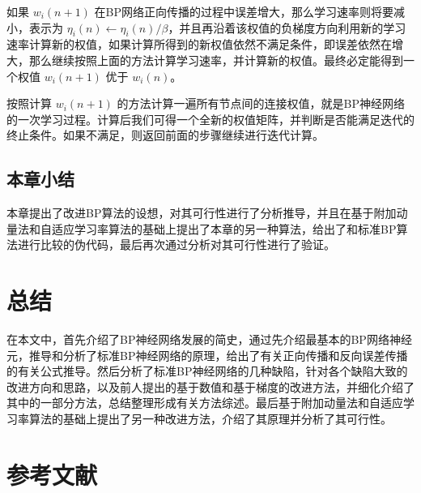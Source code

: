 \documentclass[UTF8]{ctexart}
\begin{document}
如果 $w_i(n+1)$ 在BP网络正向传播的过程中误差增大，那么学习速率则将要减小，表示为 $\eta_i(n) \gets \eta_i(n) / \beta$，并且再沿着该权值的负梯度方向利用新的学习速率计算新的权值，如果计算所得到的新权值依然不满足条件，即误差依然在增大，那么继续按照上面的方法计算学习速率，并计算新的权值。最终必定能得到一个权值 $w_i(n+1)$ 优于 $w_i(n)$。 \par

按照计算 $w_i(n+1)$ 的方法计算一遍所有节点间的连接权值，就是BP神经网络的一次学习过程。计算后我们可得一个全新的权值矩阵，并判断是否能满足迭代的终止条件。如果不满足，则返回前面的步骤继续进行迭代计算。

\subsection{本章小结}

本章提出了改进BP算法的设想，对其可行性进行了分析推导，并且在基于附加动量法和自适应学习率算法的基础上提出了本章的另一种算法，给出了和标准BP算法进行比较的伪代码，最后再次通过分析对其可行性进行了验证。

\section{总结}

在本文中，首先介绍了BP神经网络发展的简史，通过先介绍最基本的BP网络神经元，推导和分析了标准BP神经网络的原理，给出了有关正向传播和反向误差传播的有关公式推导。然后分析了标准BP神经网络的几种缺陷，针对各个缺陷大致的改进方向和思路，以及前人提出的基于数值和基于梯度的改进方法，并细化介绍了其中的一部分方法，总结整理形成有关方法综述。最后基于附加动量法和自适应学习率算法的基础上提出了另一种改进方法，介绍了其原理并分析了其可行性。

\section{参考文献}
\end{document}
